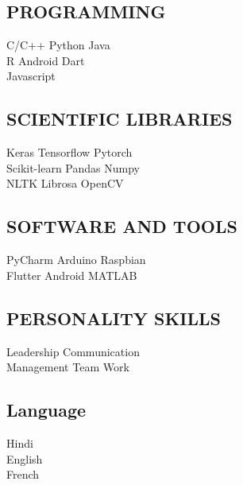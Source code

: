 \documentclass[a4paper]{deedy-resume-openfont}
\begin{document}
\begin{minipage}[t]{0.33\textwidth}
\subsection{PROGRAMMING}
\textbullet{}   C/C++ \textbullet{}   Python \textbullet{} Java \\
\textbullet{} R \textbullet{} Android \textbullet{} Dart \\ 
\textbullet{} Javascript 
\sectionsep
\subsection{SCIENTIFIC LIBRARIES}
\textbullet{} Keras \textbullet{} Tensorflow \textbullet{} Pytorch \\
\textbullet{} Scikit-learn \textbullet{} Pandas \textbullet{} Numpy \\
\textbullet{} NLTK \textbullet{} Librosa \textbullet{} OpenCV \\ 
\sectionsep
\subsection{SOFTWARE AND TOOLS}
\textbullet{} PyCharm \textbullet{} Arduino \textbullet{} Raspbian \\
\textbullet{} Flutter \textbullet{} Android \textbullet{} MATLAB \\
\sectionsep
\subsection{PERSONALITY SKILLS}
\textbullet{} Leadership \textbullet{} Communication \\
\textbullet{} Management \textbullet{} Team Work
\sectionsep
\subsection{Language}
 Hindi\\
 English\\
 French\\
%
%

\end{minipage} 
\hfill
\end{document}
